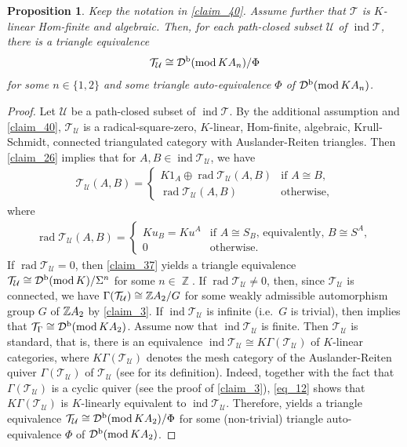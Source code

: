 \documentclass[12pt]{amsart}
\numberwithin{equation}{subsection}
\theoremstyle{plain}
\newtheorem{proposition}[theorem]{Proposition}
\theoremstyle{definition}
\newcommand{\rad}{\operatorname{rad}}
\renewcommand{\mod}{\mathrm{mod}\,}
\newcommand{\ind}{\operatorname{ind}}
\newcommand{\Z}{\operatorname{\mathbb{Z}}\nolimits}
\newcommand{\G}{\Gamma}
\newcommand{\T}{\mathcal{T}}
\newcommand{\U}{\mathcal{U}}
\newcommand{\D}{\mathcal{D}}
\newcommand{\ZA}{\Z\hspace{-.6mm}A}
\begin{document}
\begin{proposition}\label{claim_36}
Keep the notation in \cref{claim_40}.
Assume further that $\T$ is $K$-linear Hom-finite and algebraic.
Then, for each path-closed subset $\U$ of $\ind\T$, there is a triangle equivalence  
\begin{align}
    \T_\U \cong  \D^{\rm b}(\mod KA_n)/\Phi
\end{align}
for some $n \in\{1, 2\}$ and some triangle auto-equivalence $\Phi$ of $\D^{\rm b}(\mod KA_n)$.
\end{proposition}
\begin{proof}
Let $\U$ be a path-closed subset of $\ind\T$.
By the additional assumption and \cref{claim_40}, $\T_\U$ is a radical-square-zero, $K$-linear, Hom-finite, algebraic, Krull-Schmidt, connected triangulated category with Auslander-Reiten triangles.
Then \cref{claim_26} implies that for $A, B \in\ind\T_\U$, we have
\begin{align}\label{eq_12}
    \T_\U(A, B) = 
    \begin{cases}
        K 1_A \oplus \rad\T_\U(A, B) & \text{if } A \cong B,\\
        \rad\T_\U(A, B) & \text{otherwise},
    \end{cases}
\end{align}
where 
\begin{align}
    \rad\T_\U(A, B) =
    \begin{cases}
        K u_B= K u^A & \mbox{if $A\cong S_B$, equivalently, $B\cong S^A$},\\
        0 & \mbox{otherwise.}
    \end{cases}
\end{align}
If $\rad\T_\U=0$, then \cref{claim_37} yields a triangle equivalence $\T_\U\cong \D^{\rm b}(\mod K)/\Sigma^n$ for some $n\in\Z$.
If $\rad\T_\U\neq 0$, then, since $\T_\U$ is connected, we have $\G(\T_\U)\cong \ZA_2/G$ for some weakly admissible automorphism group $G$ of $\ZA_2$ by \cref{claim_3}.
If $\ind\T_\U$ is infinite (i.e.~$G$ is trivial), then \cite[Theorem 5.1]{Krause_2012} implies that $\T_\G\cong \D^{\rm b}(\mod KA_2)$.
Assume now that $\ind\T_\U$ is finite.
Then $\T_\U$ is standard, that is, there is an equivalence $\ind\T_\U \cong K\G(\T_\U)$ of $K$-linear categories, where $K\G(\T_\U)$ denotes the mesh category of the Auslander-Reiten quiver $\G(\T_\U)$ of $\T_\U$ (see \cite[5.6]{Happel_book} for its definition).
Indeed, together with the fact that $\G(\T_\U)$ is a cyclic quiver (see the proof of \cref{claim_3}), \eqref{eq_12} shows that $K\G(\T_\U)$ is $K$-linearly equivalent to $\ind\T_\U$.
Therefore, \cite[Theorem 7.2]{Amiot_2007} yields a triangle equivalence $\T_\U\cong \D^{\rm b}(\mod KA_2)/\Phi$ for some (non-trivial) triangle auto-equivalence $\Phi$ of $\D^{\rm b}(\mod KA_2)$.
\end{proof}
\end{document}

